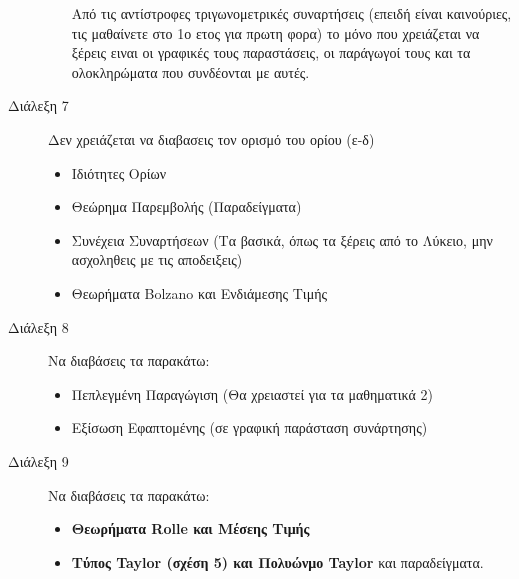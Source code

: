 \documentclass[a4paper,12pt]{article}
\begin{document}
\begin{description}
\begin{itemize}
    Από τις αντίστροφες τριγωνομετρικές συναρτήσεις
    (επειδή είναι καινούριες, τις μαθαίνετε στο 1ο ετος για πρωτη φορα) το
    μόνο που χρειάζεται να ξέρεις ειναι οι γραφικές τους παραστάσεις, οι
    παράγωγοί τους και τα ολοκληρώματα που συνδέονται με αυτές.
  \end{itemize}
  \item[Διάλεξη 7] Δεν χρειάζεται να διαβασεις τον ορισμό του ορίου (ε-δ)

\begin{itemize}
  \item Ιδιότητες Ορίων
  \item Θεώρημα Παρεμβολής (Παραδείγματα)
  \item Συνέχεια Συναρτήσεων (Τα βασικά, όπως τα ξέρεις από το Λύκειο, μην
  ασχοληθεις με τις αποδειξεις)
  \item Θεωρήματα \textlatin{Bolzano} και Ενδιάμεσης Τιμής
\end{itemize}

\item[Διάλεξη 8] Να διαβάσεις τα παρακάτω:
\begin{itemize}
  \item Πεπλεγμένη Παραγώγιση (Θα χρειαστεί για τα μαθηματικά 2)
  \item Εξίσωση Εφαπτομένης (σε γραφική παράσταση συνάρτησης)
\end{itemize}

\item[Διάλεξη 9] Να διαβάσεις τα παρακάτω:
\begin{itemize}
  \item \textbf{Θεωρήματα \textlatin{Rolle} και Μέσεης Τιμής}
  \item \textbf{Τύπος \textlatin{Taylor} (σχέση 5) και Πολυώνμο
   \textlatin{Taylor}} και παραδείγματα.
\end{itemize}


\end{description}
\end{document}

